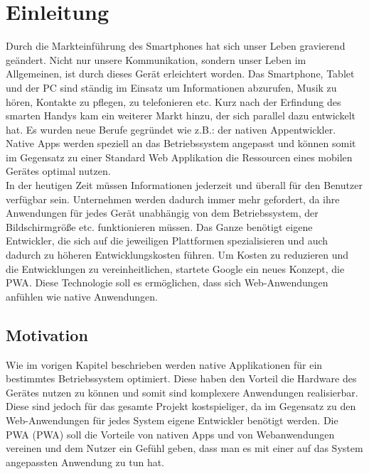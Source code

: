 \chapter{Einleitung}\label{chap:Einleitung}
\thispagestyle{standard}
\pagestyle{standard}
\renewcommand{\footrulewidth}{0.4pt}

Durch die Markteinführung des Smartphones hat sich unser Leben gravierend geändert. 
Nicht nur unsere Kommunikation, sondern unser Leben im Allgemeinen, ist durch dieses Gerät erleichtert worden.
Das Smartphone, Tablet und der PC sind ständig im Einsatz um Informationen abzurufen, Musik zu hören, Kontakte zu pflegen, zu telefonieren etc. Kurz nach der Erfindung des smarten Handys kam ein weiterer Markt 
hinzu, der sich parallel dazu entwickelt hat. Es wurden neue Berufe gegründet wie z.B.: der nativen Appentwickler.
Native Apps werden speziell an das Betriebssystem angepasst und können somit im Gegensatz zu einer Standard Web Applikation die Ressourcen eines mobilen Gerätes optimal nutzen.\\ In der heutigen Zeit müssen Informationen jederzeit und überall für den Benutzer verfügbar sein. Unternehmen werden dadurch immer mehr gefordert, da ihre Anwendungen für jedes Gerät unabhängig von dem Betriebssystem, der Bildschirmgröße etc. funktionieren müssen. Das Ganze benötigt eigene Entwickler, die sich auf die jeweiligen Plattformen spezialisieren und auch dadurch zu höheren Entwicklungskosten führen. Um Kosten zu reduzieren und die Entwicklungen zu vereinheitlichen, startete Google ein neues Konzept, die \acl{PWA}. 
Diese Technologie soll es ermöglichen, dass sich Web-Anwendungen anfühlen wie native Anwendungen.   


\section{Motivation} \label{sub:Motivation}
Wie im vorigen Kapitel beschrieben werden native Applikationen für ein bestimmtes Betriebssystem optimiert. Diese haben den Vorteil die Hardware des Gerätes nutzen zu können und somit sind komplexere Anwendungen realisierbar. Diese sind jedoch für das gesamte Projekt kostspieliger, da im Gegensatz zu den Web-Anwendungen für jedes System eigene Entwickler benötigt werden.
Die \acl{PWA} (\acs{PWA}) soll die Vorteile von nativen Apps und von Webanwendungen vereinen und dem Nutzer ein Gefühl geben, dass man es mit einer auf das System angepassten Anwendung zu tun hat.  




